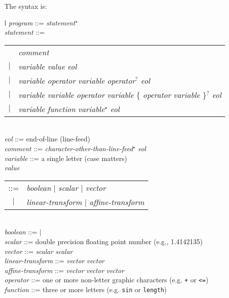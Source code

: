 \documentclass[12pt]{article}
\begin{document}
The syntax is:
\\[1ex]
\hspace*{0.2in}\begin{tabular}{l}
{\em program} ::= {\em statement}$^\star$ \\
{\em statement} ::= \\
\hspace*{0.2in}\begin{tabular}[t]{cl}
                    & {\em comment} \\
                $|$ & {\em variable} \TT{=} {\em value} {\em eol}\\
                $|$ & {\em variable} \TT{=} {\em operator}
		          {\em variable} 
		          {\em operator}$^?$ {\em eol} \\
                $|$ & {\em variable} \TT{=} {\em variable} {\em operator}
		          {\em variable}
		          \{ {\em operator} {\em variable} \}$^?$
			  {\em eol} \\
                $|$ & {\em variable} \TT{=} {\em function}
		          {\em variable}$^\star$ {\em eol} \\
		\end{tabular}
\\[1ex]
{\em eol} ::= end-of-line (line-feed) \\
{\em comment} ::= \TT{\#} {\em character-other-than-line-feed}$^\star$
                  {\em eol} \\
{\em variable} ::= a single letter (case matters) \\
{\em value} \begin{tabular}[t]{cl}
            ::= & {\em boolean} $|$ {\em scalar} $|$ {\em vector} \\
	    $|$ & {\em linear-transform} $|$
	          {\em affine-transform} \\
	    \end{tabular} \\
{\em boolean} ::=  $|$  \\
{\em scalar} ::= double precision floating point number (e.g., 1.4142135) \\
{\em vector} ::= \TT{(} {\em scalar}\TT{,} {\em scalar} \TT{)} \\
{\em linear-transform} ::= \TT{(} {\em vector}\TT{,} {\em vector} \TT{)} \\
{\em affine-transform} ::= \TT{(} {\em vector}\TT{,} {\em vector}\TT{,}
                                  {\em vector} \TT{)} \\
{\em operator} ::= one or more non-letter graphic characters
                   (e.g. {\tt +} or {\tt <=})\\
{\em function} ::= three or more letters (e.g. {\tt sin} or {\tt length}) \\
\end{tabular}
\end{document}
